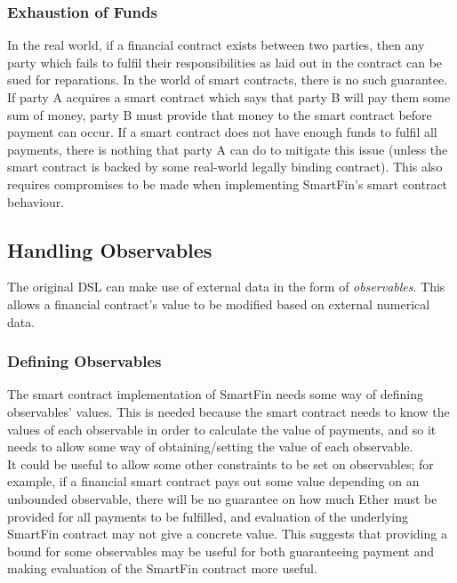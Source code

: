 \subsubsection{Exhaustion of Funds} \label{fund-exhaustion}

In the real world, if a financial contract exists between two parties, then any party which fails to fulfil their responsibilities as laid out in the contract can be sued for reparations. In the world of smart contracts, there is no such guarantee. If party A acquires a smart contract which says that party B will pay them some sum of money, party B must provide that money to the smart contract before payment can occur. If a smart contract does not have enough funds to fulfil all payments, there is nothing that party A can do to mitigate this issue (unless the smart contract is backed by some real-world legally binding contract). This also requires compromises to be made when implementing SmartFin's smart contract behaviour.


\subsection{Handling Observables} \label{dsl-observables}

The original DSL can make use of external data in the form of \textit{observables}. This allows a financial contract's value to be modified based on external numerical data.

\subsubsection{Defining Observables}

The smart contract implementation of SmartFin needs some way of defining observables' values. This is needed because the smart contract needs to know the values of each observable in order to calculate the value of payments, and so it needs to allow some way of obtaining/setting the value of each observable. \\

It could be useful to allow some other constraints to be set on observables; for example, if a financial smart contract pays out some value depending on an unbounded observable, there will be no guarantee on how much Ether must be provided for all payments to be fulfilled, and evaluation of the underlying SmartFin contract may not give a concrete value. This suggests that providing a bound for some observables may be useful for both guaranteeing payment and making evaluation of the SmartFin contract more useful.

